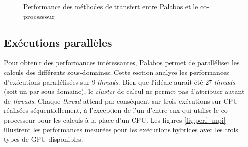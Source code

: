 \begin{figure}[h]
	\centering
	\caption{Performance des méthodes de transfert entre Palabos et le co-processeur}
	\label{fig:trsf_methods}
\end{figure}

\subsection{Exécutions parallèles}
Pour obtenir des performances intéressantes, Palabos permet de paralléliser les calculs des différents sous-domaines. Cette section analyse les performances d'exécutions parallélisées sur 9 \textit{threads}. Bien que l'idéale aurait été 27 \textit{threads} (soit un par sous-domaine), le \textit{cluster} de calcul ne permet pas d'attribuer autant de \textit{threads}. Chaque \textit{thread} attend par conséquent sur trois exécutions sur \acs{CPU} réalisées séquentiellement, à l'exception de l'un d'entre eux qui utilise le co-processeur pour les calculs à la place d'un \acs{CPU}. Les figures \ref{fig:perf_mpi} illustrent les  performances mesurées pour les exécutions hybrides avec les trois types de \acs{GPU} disponibles.

